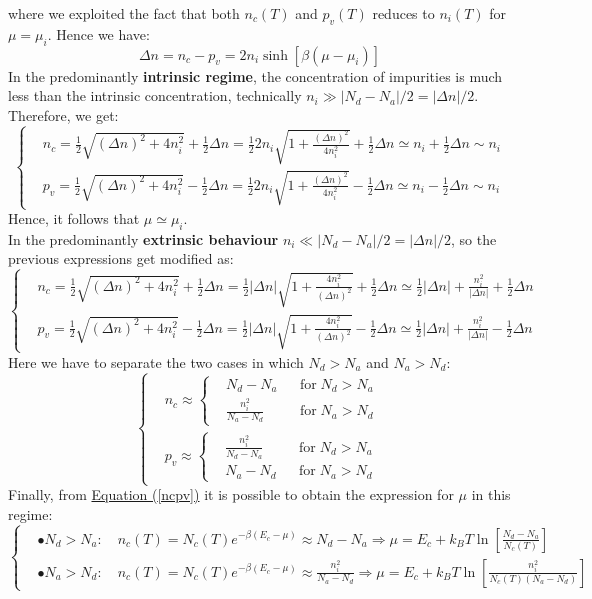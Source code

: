 \documentclass[10.75pt,a4paper,openright,bottom=2cm]{article}
\renewcommand{\refeq}[1]{\hyperref[#1]{Equation (\ref{#1})}}
\begin{document}
where we exploited the fact that both $n_c(T)$ and $p_v(T)$ reduces to $n_i(T)$ for $\mu=\mu_i$. Hence we have:
\[
\Delta n=n_c-p_v=2n_i\sinh{[\beta(\mu-\mu_i)]}
\]
 In the predominantly \textbf{intrinsic regime}, the concentration of impurities is much less than the intrinsic concentration, technically $n_i\gg|N_d-N_a|/2=|\Delta n|/2$. Therefore, we get:
\[
\left\{
\begin{aligned}
&n_c=\frac{1}{2}\sqrt{(\Delta n)^2+4n_i^2}+\frac{1}{2}\Delta n=\frac{1}{2}2n_i\sqrt{1+\frac{(\Delta n)^2}{4n_i^2}}+\frac{1}{2}\Delta n\simeq n_i+\frac{1}{2}\Delta n\sim n_i\\
&p_v=\frac{1}{2}\sqrt{(\Delta n)^2+4n_i^2}-\frac{1}{2}\Delta n=\frac{1}{2}2n_i\sqrt{1+\frac{(\Delta n)^2}{4n_i^2}}-\frac{1}{2}\Delta n\simeq n_i-\frac{1}{2}\Delta n\sim n_i
\end{aligned}
\right.
\]
Hence, it follows that $\mu\simeq\mu_i$.\\
In the predominantly \textbf{extrinsic behaviour} $n_i\ll|N_d-N_a|/2=|\Delta n|/2$, so the previous expressions get modified as:
\[
\left\{
\begin{aligned}
&n_c=\frac{1}{2}\sqrt{(\Delta n)^2+4n_i^2}+\frac{1}{2}\Delta n=\frac{1}{2}|\Delta n|\sqrt{1+\frac{4n_i^2}{(\Delta n)^2}}+\frac{1}{2}\Delta n\simeq \frac{1}{2}|\Delta n|+\frac{n_i^2}{|\Delta n|}+\frac{1}{2}\Delta n\\
&p_v=\frac{1}{2}\sqrt{(\Delta n)^2+4n_i^2}-\frac{1}{2}\Delta n=\frac{1}{2}|\Delta n|\sqrt{1+\frac{4n_i^2}{(\Delta n)^2}}-\frac{1}{2}\Delta n\simeq \frac{1}{2}|\Delta n|+\frac{n_i^2}{|\Delta n|}-\frac{1}{2}\Delta n
\end{aligned}
\right.
\]
Here we have to separate the two cases in which $N_d>N_a$ and $N_a>N_d$:
\[
\left\{
\begin{aligned}
&n_c\approx\left\{
\begin{aligned}&N_d-N_a&&\text{for}\;N_d>N_a\\
&\frac{n_i^2}{N_a-N_d}&&\text{for}\;N_a>N_d
\end{aligned}
\right.\\
&p_v\approx\left\{
\begin{aligned}&\frac{n_i^2}{N_d-N_a}&&\text{for}\;N_d>N_a\\
&N_a-N_d&&\text{for}\;N_a>N_d
\end{aligned}
\right.
\end{aligned}
\right.
\]
Finally, from \refeq{ncpv} it is possible to obtain the expression for $\mu$ in this regime:
\[
\left\{
\begin{aligned}
&\bullet N_d>N_a: \quad n_c(T)=N_c(T)e^{-\beta(E_c-\mu)}\approx N_d-N_a\Rightarrow\mu=E_c+k_BT\ln\left[\frac{N_d-N_a}{N_c(T)}\right]\\
&\bullet N_a>N_d: \quad n_c(T)=N_c(T)e^{-\beta(E_c-\mu)}\approx \frac{n_i^2}{N_a-N_d}\Rightarrow\mu=E_c+k_BT\ln\left[\frac{n_i^2}{N_c(T)(N_a-N_d)}\right]
\end{aligned}
\right.
\]
\end{document}
